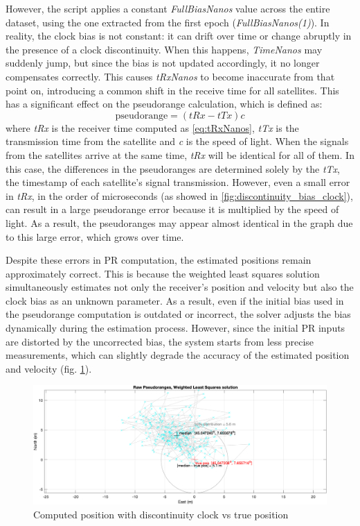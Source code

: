 However, the script applies a constant \textit{FullBiasNanos} value across the entire dataset, using the one extracted from the first epoch (\textit{FullBiasNanos(1)}). In reality, the clock bias is not constant: it can drift over time or change abruptly in the presence of a clock discontinuity. When this happens, \textit{TimeNanos} may suddenly jump, but since the bias is not updated accordingly, it no longer compensates correctly. This causes \textit{tRxNanos} to become inaccurate from that point on, introducing a common shift in the receive time for all satellites.
This has a significant effect on the pseudorange calculation, which is defined as:
\begin{equation*}
    \text{pseudorange} = (tRx - tTx)c
\end{equation*}
where \textit{tRx} is the receiver time computed as \ref{eq:tRxNanos}, \textit{tTx} is the transmission time from the satellite and \textit{c} is the speed of light.
When the signals from the satellites arrive at the same time, \textit{tRx} will be identical for all of them. In this case, the differences in the pseudoranges are determined solely by the \textit{tTx}, the timestamp of each satellite’s signal transmission. However, even a small error in \textit{tRx}, in the order of microseconds (as showed in \ref{fig:discontinuity_bias_clock}), can result in a large pseudorange error because it is multiplied by the speed of light. As a result, the pseudoranges may appear almost identical in the graph due to this large error, which grows over time.

Despite these errors in PR computation, the estimated positions remain approximately correct. This is because the weighted least squares solution simultaneously estimates not only the receiver’s position and velocity but also the clock bias as an unknown parameter. As a result, even if the initial bias used in the pseudorange computation is outdated or incorrect, the solver adjusts the bias dynamically during the estimation process. However, since the initial PR inputs are distorted by the uncorrected bias, the system starts from less precise measurements, which can slightly degrade the accuracy of the estimated position and velocity (fig. \ref{fig:discontinuity_map_computed_position_vs_true_postion}).

\begin{figure}[H]
    \centering
    \includegraphics[width=0.85\linewidth]{images/discontinuity_map_computed_position_vs_true_postion.png}
    \caption{Computed position with discontinuity clock vs true position}
    \label{fig:discontinuity_map_computed_position_vs_true_postion}
\end{figure}

